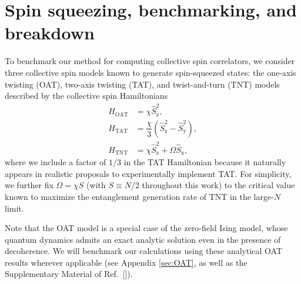 \documentclass[aps,pra,twocolumn,longbibliography]{revtex4-2}
\renewcommand{\t}{\text} %
\newcommand{\f}[2]{\dfrac{#1}{#2}} %
\newcommand{\p}[1]{\left( #1 \right)} %
\newcommand{\z}{\text{z}}
\newcommand{\x}{\text{x}}
\newcommand{\y}{\text{y}}
\newcommand{\1}{\mathds{1}}
\begin{document}
\section{Spin squeezing, benchmarking, and breakdown}
\label{sec:squeezing}

To benchmark our method for computing collective spin correlators, we
consider three collective spin models known to generate spin-squeezed
states: the one-axis twisting (OAT), two-axis twisting (TAT), and
twist-and-turn (TNT) models described by the collective spin
Hamiltonians\cite{ma2011quantum}
\begin{align}
  H_{\t{OAT}} &= \chi \hat S_\z^2, \label{eq:OAT} \\
  H_{\t{TAT}}
  &= \f{\chi}{3} \p{\hat S_\z^2 - \hat S_\y^2}, \label{eq:TAT} \\
  H_{\t{TNT}} &= \chi \hat S_\z^2 + \Omega \hat S_\x, \label{eq:TNT}
\end{align}
where we include a factor of $1/3$ in the TAT Hamiltonian because it
naturally appears in realistic proposals to experimentally implement
TAT\cite{liu2011spin, huang2015twoaxis}.  For simplicity, we further
fix $\Omega=\chi S$ (with $S\equiv N/2$ throughout this work) to the
critical value known to maximize the entanglement generation rate of
TNT in the large-$N$ limit\cite{micheli2003manyparticle,
  sorelli2019fast}.

Note that the OAT model is a special case of the zero-field Ising
model, whose quantum dynamics admits an exact analytic solution even
in the presence of decoherence\cite{foss-feig2013nonequilibrium}.  We
will benchmark our calculations using these analytical OAT results
wherever applicable (see Appendix \ref{sec:OAT}, as well as the
Supplementary Material of Ref.~[]).
\end{document}
